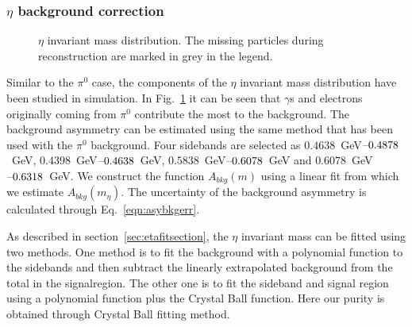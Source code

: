 \subsubsection{\texorpdfstring{$\eta$ background correction}{eta background correction}}
\begin{figure}[H]
  \centering     
  \caption{$\eta$ invariant mass distribution. The missing particles during reconstruction are marked in grey in the legend.}
  \label{fig:etacomponent}
\end{figure}
Similar to the $\pi^0$ case, the components of the $\eta$ invariant mass distribution have been studied in simulation. In Fig.~\ref{fig:etacomponent} it can be seen that $\gamma$s and electrons originally coming from $\pi^0$ contribute the most to the background. The background asymmetry can be estimated using the same method that has been used with the $\pi^0$ background. Four sidebands are selected as $0.4638$~GeV$\textup{--}0.4878$~GeV, $0.4398$~GeV$\textup{--}0.4638$~GeV, $0.5838$~GeV$\textup{--}0.6078$~GeV and $0.6078$~GeV$\textup{--}0.6318$~GeV. We construct the function $A_{bkg}(m)$ using a linear fit from which we estimate  $A_{bkg}(m_{\eta})$. The uncertainty of the background asymmetry is calculated through Eq.~\eqref{eqn:asybkgerr}.

As described in section~\ref{sec:etafitsection}, the $\eta$ invariant mass can be fitted using two methods. One method is to fit the background with a polynomial function to the sidebands and then subtract the linearly extrapolated background from the total in the signalregion. The other one is to fit the sideband and signal region using a polynomial function plus the Crystal Ball function. Here our purity is obtained through Crystal Ball fitting method.%

